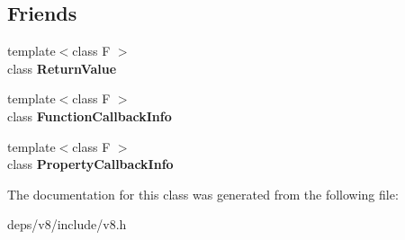 \subsection*{Friends}
\begin{DoxyCompactItemize}
\item 
\hypertarget{classv8_1_1_return_value_a53f604d3d6f2dc0647df33c9979f116a}{}{\footnotesize template$<$class F $>$ }\\class {\bfseries Return\+Value}\label{classv8_1_1_return_value_a53f604d3d6f2dc0647df33c9979f116a}

\item 
\hypertarget{classv8_1_1_return_value_a76786e6fa2d0eac5e2d4f647659d0d23}{}{\footnotesize template$<$class F $>$ }\\class {\bfseries Function\+Callback\+Info}\label{classv8_1_1_return_value_a76786e6fa2d0eac5e2d4f647659d0d23}

\item 
\hypertarget{classv8_1_1_return_value_a5018adab21fade2b42f4f60e45fa1083}{}{\footnotesize template$<$class F $>$ }\\class {\bfseries Property\+Callback\+Info}\label{classv8_1_1_return_value_a5018adab21fade2b42f4f60e45fa1083}

\end{DoxyCompactItemize}


The documentation for this class was generated from the following file\+:\begin{DoxyCompactItemize}
\item 
deps/v8/include/v8.\+h\end{DoxyCompactItemize}
